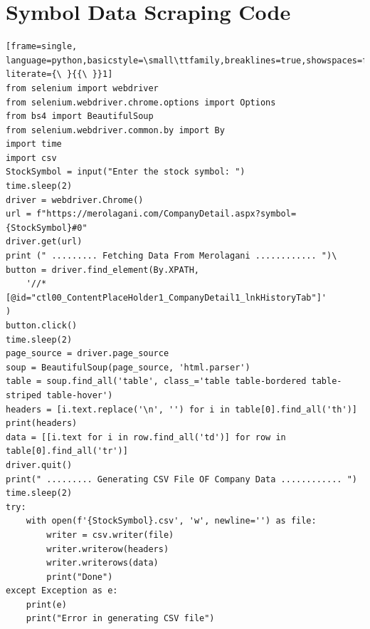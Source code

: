 \documentclass[./main.tex]{subfiles}
\begin{document}
\section*{Symbol Data Scraping Code }
\begin{lstlisting}[frame=single, language=python,basicstyle=\small\ttfamily,breaklines=true,showspaces=false,columns=fullflexible, literate={\ }{{\ }}1]
from selenium import webdriver
from selenium.webdriver.chrome.options import Options
from bs4 import BeautifulSoup
from selenium.webdriver.common.by import By
import time
import csv
StockSymbol = input("Enter the stock symbol: ")
time.sleep(2)
driver = webdriver.Chrome()
url = f"https://merolagani.com/CompanyDetail.aspx?symbol={StockSymbol}#0"
driver.get(url)
print (" ......... Fetching Data From Merolagani ............ ")\
button = driver.find_element(By.XPATH,
    '//*[@id="ctl00_ContentPlaceHolder1_CompanyDetail1_lnkHistoryTab"]'
)
button.click()
time.sleep(2)
page_source = driver.page_source
soup = BeautifulSoup(page_source, 'html.parser')
table = soup.find_all('table', class_='table table-bordered table-striped table-hover')
headers = [i.text.replace('\n', '') for i in table[0].find_all('th')]
print(headers)
data = [[i.text for i in row.find_all('td')] for row in table[0].find_all('tr')]
driver.quit()
print(" ......... Generating CSV File OF Company Data ............ ")
time.sleep(2)
try:
    with open(f'{StockSymbol}.csv', 'w', newline='') as file:
        writer = csv.writer(file)
        writer.writerow(headers)
        writer.writerows(data)
        print("Done")
except Exception as e:
    print(e)
    print("Error in generating CSV file")

\end{lstlisting}
\newpage
\end{document}
